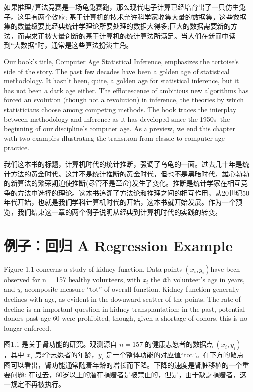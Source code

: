 \documentclass[]{ctexbook}
\theoremstyle{definition}
\theoremstyle{definition}
\theoremstyle{definition}
\theoremstyle{remark}
\begin{document}
如果推理/算法竞赛是一场龟兔赛跑，那么现代电子计算已经培育出了一只仿生兔子。这里有两个效应:
基于计算机的技术允许科学家收集大量的数据集，这些数据集的数量级要比经典统计学理论所要处理的数据大得多;巨大的数据需要新的方法，而需求正被大量创新的基于计算机的统计算法所满足。当人们在新闻中读到``大数据''时，通常是这些算法扮演主角。

Our book's title, Computer Age Statistical Inference, emphasizes the
tortoise's side of the story. The past few decades have been a golden
age of statistical methodology. It hasn't been, quite, a golden age for
statistical inference, but it has not been a dark age either. The
efflorescence of ambitious new algorithms has forced an evolution
(though not a revolution) in inference, the theories by which
statisticians choose among competing methods. The book traces the
interplay between methodology and inference as it has developed since
the 1950s, the beginning of our discipline's computer age. As a preview,
we end this chapter with two examples illustrating the transition from
classic to computer-age practice.

我们这本书的标题，计算机时代的统计推断，强调了乌龟的一面。过去几十年是统计方法的黄金时代。这并不是统计推断的黄金时代，但也不是黑暗时代。雄心勃勃的新算法的繁荣期迫使推断(尽管不是革命)发生了变化。推断是统计学家在相互竞争的方法中选择的理论。这本书追溯了方法论和推理之间的相互作用，从20世纪50年代开始，也就是我们学科计算机时代的开始，这本书就开始发展。作为一个预览，我们结束这一章的两个例子说明从经典到计算机时代的实践的转变。

\hypertarget{-a-regression-example}{%
\section{例子：回归 A Regression Example}\label{-a-regression-example}}

Figure 1.1 concerns a study of kidney function. Data points
\((x_i, y_i)\)have been observed for n = 157 healthy volunteers, with
\(x_i\) the \emph{i}th volunteer's age in years, and \(y_i\) acomposite
measure ``tot'' of overall function. Kidney function generally declines
with age, as evident in the downward scatter of the points. The rate of
decline is an important question in kidney transplantation: in the past,
potential donors past age 60 were prohibited, though, given a shortage
of donors, this is no longer enforced.

图1.1 是关于肾功能的研究。观测源自 \(n = 157\) 的健康志愿者的数据点
\((x_i, y_i)\) ，其中 \(x_i\) 第\emph{i}个志愿者的年龄，\(y_i\)
是一个整体功能的对应值``tot''。在下方的散点图可以看出，肾功能通常随着年龄的增长而下降。下降的速度是肾脏移植的一个重要问题:
在过去，60岁以上的潜在捐赠者是被禁止的，但是，由于缺乏捐赠者，这一规定不再被执行。
\end{document}
